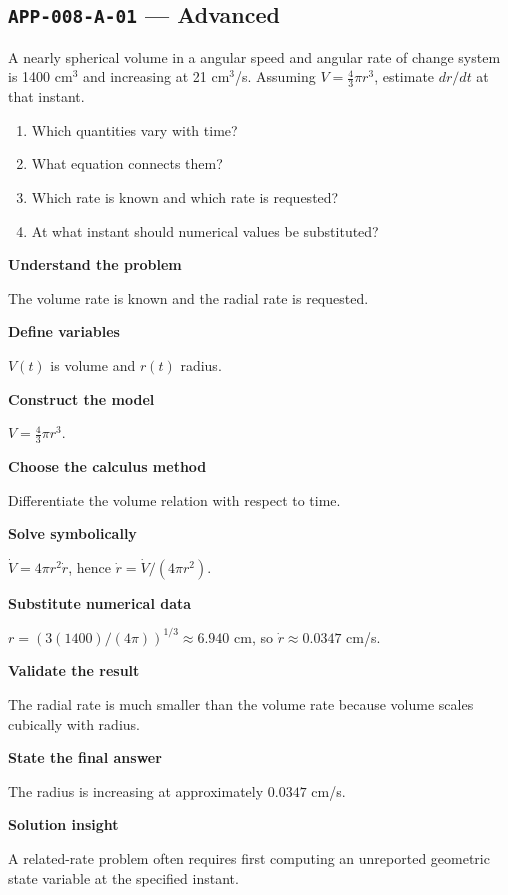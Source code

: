 \documentclass[11pt]{book}
\newcommand{\pid}[1]{\texttt{#1}}
\begin{document}
\subsection*{\pid{APP-008-A-01} — Advanced}
\begin{problembox}
A nearly spherical volume in a angular speed and angular rate of change system is 1400 cm$^3$ and increasing at 21 cm$^3$/s. Assuming $V=\frac43\pi r^3$, estimate $dr/dt$ at that instant.
\end{problembox}
\begin{promptbox}\begin{enumerate}
\item Which quantities vary with time?
\item What equation connects them?
\item Which rate is known and which rate is requested?
\item At what instant should numerical values be substituted?
\end{enumerate}\end{promptbox}
\begin{solutionbox}
\textbf{Understand the problem}\par The volume rate is known and the radial rate is requested.\par\medskip
\textbf{Define variables}\par $V(t)$ is volume and $r(t)$ radius.\par\medskip
\textbf{Construct the model}\par $V=\frac43\pi r^3$.\par\medskip
\textbf{Choose the calculus method}\par Differentiate the volume relation with respect to time.\par\medskip
\textbf{Solve symbolically}\par $\dot V=4\pi r^2\dot r$, hence $\dot r=\dot V/(4\pi r^2)$.\par\medskip
\textbf{Substitute numerical data}\par $r=(3(1400)/(4\pi))^{1/3}\approx 6.940$ cm, so $\dot r\approx 0.0347$ cm/s.\par\medskip
\textbf{Validate the result}\par The radial rate is much smaller than the volume rate because volume scales cubically with radius.\par\medskip
\textbf{State the final answer}\par The radius is increasing at approximately $0.0347$ cm/s.\par\medskip
\textbf{Solution insight}\par A related-rate problem often requires first computing an unreported geometric state variable at the specified instant.\par\medskip
\end{solutionbox}
\end{document}
